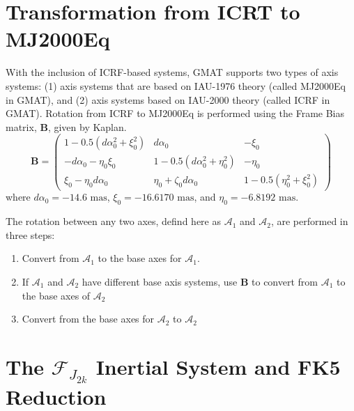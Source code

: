 \section{Transformation from ICRT to MJ2000Eq}

With the inclusion of ICRF-based systems, GMAT supports two types of axis systems: (1) axis systems that are
based on IAU-1976 theory (called MJ2000Eq in GMAT), and (2) axis systems based on IAU-2000 theory (called ICRF in GMAT).  Rotation from ICRF to MJ2000Eq is performed using the Frame Bias matrix, $\mathbf{B}$, given by Kaplan\cite{Kaplan:05}.
\begin{equation}
   \mathbf{B} = \left(
   \begin{array}{ccc}
       1 - 0.5(d\alpha_0^2 + \xi_0^2) & d \alpha_0 & -\xi_0\\
       -d \alpha_0 - \eta_0 \xi_0 & 1 - 0.5(d \alpha_0^2 + \eta_0^2) & -\eta_0\\
      \xi_0 - \eta_0 d \alpha_0 & \eta_0+\zeta_0 d \alpha_0 & 1 - 0.5(\eta_0^2 + \xi_0^2)
   \end{array}
   \right)
\end{equation}
%
where $d\alpha_0 = -14.6 \mbox{ mas}$, $\xi_0 = -16.6170 \mbox{ mas}$, and $\eta_0 = -6.8192 \mbox{ mas}$.

The rotation between any two axes, defind here as $\mathcal{A}_1$ and $\mathcal{A}_2$, are performed in three steps:
%
\begin{enumerate}
   \item Convert from $\mathcal{A}_1$ to the base axes for $\mathcal{A}_1$.
   \item If $\mathcal{A}_1$ and $\mathcal{A}_2$ have different base axis systems, use $\mathbf{B}$ to convert from $\mathcal{A}_1$ to the base axes of $\mathcal{A}_2$
   \item Convert from the base axes for $\mathcal{A}_2$ to $\mathcal{A}_2$
\end{enumerate}


\section{The $\mathcal{F}_{J_{2k}}$ Inertial System and FK5 Reduction}

